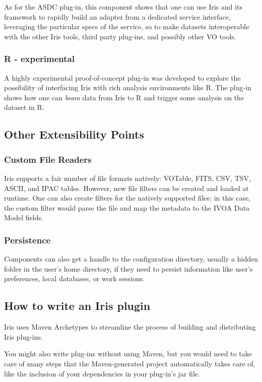 \documentclass[5p]{elsarticle}
\begin{document}
As for the ASDC plug-in, this component shows that one can use Iris and its framework to rapidly build an adapter from a dedicated service interface, leveraging the particular specs of the service, so to make datasets interoperable with the other Iris tools, third party plug-ins, and possibly other VO tools.

\subsubsection{R - experimental}
A highly experimental proof-of-concept plug-in was developed to explore the possibility of interfacing Iris with rich analysis environments like R. The plug-in shows how one can \emph{beam} data from Iris to R and trigger some analysis on the dataset in R.


\subsection{Other Extensibility Points}

\subsubsection{Custom File Readers}
Iris supports a fair number of {fi}le formats natively: VOTable,
FITS, CSV, TSV, ASCII, and IPAC tables. However, new {fi}le {fi}lters can be created and
loaded at runtime. One can also create {fi}lters for the natively supported {fi}les: in this
case, the custom {fi}lter would parse the {fi}le and map the metadata to the IVOA Data
Model {fi}elds.

\subsubsection{Persistence}
Components can also get a handle to the configuration directory, usually a hidden folder in the user's home directory, if they need to persist information like user's preferences, local databases, or work sessions.



\subsection{How to write an Iris plugin}
\label{sec:writeplugin}
Iris uses Maven Archetypes to streamline the process of building and distributing Iris plug-ins.

You might also write plug-ins without using Maven, but you would need to take care of many steps that the Maven-generated project automatically takes care of, like the inclusion of your dependencies in your plug-in's jar file.
\end{document}
